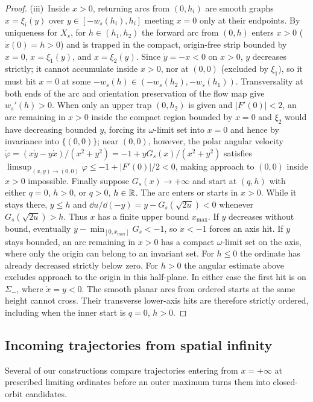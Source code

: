 \begin{proof}
(iii)~Inside $x>0$, returning arcs from $(0,h_i)$ are smooth graphs $x=\xi_i(y)$ over $y\in[-w_s(h_i),h_i]$ meeting $x=0$ only at their endpoints. By uniqueness for $X_s$, for $h\in(h_1,h_2)$ the forward arc from $(0,h)$ enters $x>0$ ($\dot x(0)=h>0$) and is trapped in the compact, origin-free strip bounded by $x=0$, $x=\xi_1(y)$, and $x=\xi_2(y)$. Since $\dot y=-x<0$ on $x>0$, $y$ decreases strictly; it cannot accumulate inside $x>0$, nor at $(0,0)$ (excluded by $\xi_1$), so it must hit $x=0$ at some $-w_s(h)\in(-w_s(h_2),-w_s(h_1))$. Transversality at both ends of the arc and orientation preservation of the flow map give $w_s'(h)>0$. When only an upper trap $(0,h_2)$ is given and $|F'(0)|<2$, an arc remaining in $x>0$ inside the compact region bounded by $x=0$ and $\xi_2$ would have decreasing bounded $y$, forcing its $\omega$-limit set into $x=0$ and hence by invariance into $\{(0,0)\}$; near $(0,0)$, however, the polar angular velocity $\dot\varphi=(x\dot y-y\dot x)/(x^2+y^2)=-1+yG_s(x)/(x^2+y^2)$ satisfies $\limsup_{(x,y)\to(0,0)}\dot\varphi\le -1+|F'(0)|/2<0$, making approach to $(0,0)$ inside $x>0$ impossible. Finally suppose $G_s(x)\to+\infty$ and start at $(q,h)$ with either
$q=0$, $h>0$, or $q>0$, $h\in\mathbb{R}$. The arc enters or starts in $x>0$.
While it stays there, $y\le h$ and
$\dd u/\dd(-y)=y-G_s(\sqrt{2u})<0$ whenever $G_s(\sqrt{2u})>h$.
Thus $x$ has a finite upper bound $x_{\max}$. If $y$ decreases without
bound, eventually $y-\min_{[0,x_{\max}]}G_s<-1$, so $\dot x<-1$
forces an axis hit. If $y$ stays bounded, an arc remaining in $x>0$
has a compact $\omega$-limit set on the axis, where only the origin
can belong to an invariant set. For $h\le0$ the ordinate has already
decreased strictly below zero. For $h>0$ the angular estimate above
excludes approach to the origin in this half-plane. In either case the
first hit is on $\Sigma_-$, where $\dot x=y<0$.
The smooth planar arcs from ordered starts at the same height cannot cross. Their transverse lower-axis hits are therefore strictly ordered, including when the inner start is $q=0$, $h>0$.
\end{proof}

\subsection{Incoming trajectories from spatial infinity}\label{subsec:incoming}
Several of our constructions compare trajectories entering from $x=+\infty$ at prescribed limiting ordinates before an outer maximum turns them into closed-orbit candidates.

